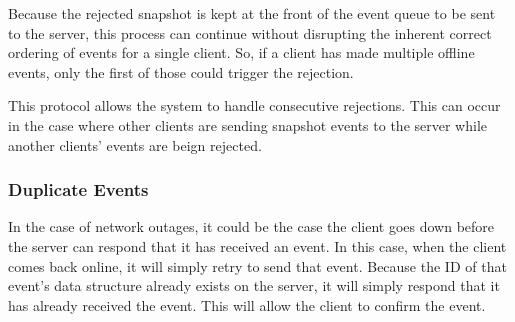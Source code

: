 Because the rejected snapshot is kept at the front of the event queue to be sent to the server, this process can continue without disrupting the inherent correct ordering of events for a single client. So, if a client has made multiple offline events, only the first of those could trigger the rejection.

This protocol allows the system to handle consecutive rejections. This can occur in the case where other clients are sending snapshot events to the server while another clients' events are beign rejected.

\subsubsection{Duplicate Events}

In the case of network outages, it could be the case the client goes down before the server can respond that it has received an event. In this case, when the client comes back online, it will simply retry to send that event. Because the ID of that event's data structure already exists on the server, it will simply respond that it has already received the event. This will allow the client to confirm the event.